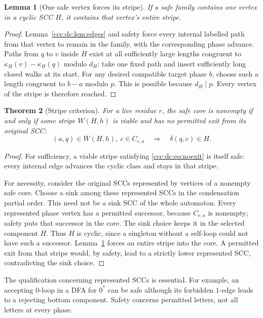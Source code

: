 \documentclass[11pt,letterpaper]{article}
\newtheorem{theorem}{Theorem}[section]
\newtheorem{lemma}[theorem]{Lemma}
\theoremstyle{definition}
\theoremstyle{remark}
\begin{document}
\begin{lemma}[One safe vertex forces its stripe]\label{ccc:dc:lem:propagation}
If a safe family contains one vertex in a cyclic SCC $H$, it contains that vertex's entire stripe.
\end{lemma}
\begin{proof}
Lemma~\ref{ccc:dc:lem:edges} and safety force every internal labelled path from that vertex to remain in the family, with the corresponding phase advance. Paths from $q$ to $v$ inside $H$ exist at all sufficiently large lengths congruent to $\kappa_H(v)-\kappa_H(q)$ modulo $d_H$: take one fixed path and insert sufficiently long closed walks at its start. For any desired compatible target phase $b$, choose such a length congruent to $b-a$ modulo $p$. This is possible because $d_H\mid p$. Every vertex of the stripe is therefore reached.
\end{proof}

\begin{theorem}[Stripe criterion]\label{ccc:dc:thm:stripe}
For a live residue $r$, the safe core is nonempty if and only if some stripe $W(H,h)$ is viable and has no permitted exit from its original SCC:
\begin{equation}\label{ccc:dc:eq:noexit}
(a,q)\in W(H,h),\ c\in C_{r,a}\quad\Longrightarrow\quad\delta(q,c)\in H.
\end{equation}
\end{theorem}
\begin{proof}
For sufficiency, a viable stripe satisfying \eqref{ccc:dc:eq:noexit} is itself safe: every internal edge advances the cyclic class and stays in that stripe.

For necessity, consider the original SCCs represented by vertices of a nonempty safe core. Choose a sink among these represented SCCs in the condensation partial order. This need not be a sink SCC of the whole automaton. Every represented phase vertex has a permitted successor, because $C_{r,a}$ is nonempty; safety puts that successor in the core. The sink choice keeps it in the selected component $H$. Thus $H$ is cyclic, since a singleton without a self-loop could not have such a successor. Lemma~\ref{ccc:dc:lem:propagation} forces an entire stripe into the core. A permitted exit from that stripe would, by safety, lead to a strictly lower represented SCC, contradicting the sink choice.
\end{proof}

The qualification concerning represented SCCs is essential. For example, an accepting $0$-loop in a DFA for $0^*$ can be safe although its forbidden $1$-edge leads to a rejecting bottom component. Safety concerns permitted letters, not all letters at every phase.
\end{document}
